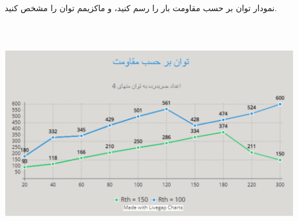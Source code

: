 \documentclass{article}
\begin{document}
		نمودار توان بر حسب مقاومت بار را رسم کنید، و ماکزیمم توان را مشخص کنید.
		
		\begin{center}
			\includegraphics[width=13cm, height=10cm]{./images/R3.3.2}
		\end{center}
\end{document}
